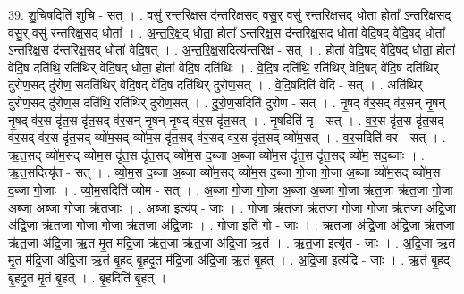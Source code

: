 \documentclass[17pt]{extarticle}
\begin{document}
39. शु॒चि॒षदिति॑ शुचि - सत् । . वसु॑ रन्तरिक्ष॒स द॑न्तरिक्ष॒सद् वसु॒र् वसु॑ रन्तरिक्ष॒सद् धोता॒ होता᳚ ऽन्तरिक्ष॒सद् वसु॒र् वसु॑ रन्तरिक्ष॒सद् धोता᳚ । . अ॒न्त॒रि॒क्ष॒द् धोता॒ होता᳚ ऽन्तरिक्ष॒स द॑न्तरिक्ष॒सद् धोता॑ वेदि॒षद् वे॑दि॒षद् धोता᳚ ऽन्तरिक्ष॒स द॑न्तरिक्ष॒सद् धोता॑ वेदि॒षत् । . अ॒न्त॒रि॒क्ष॒सदित्य॑न्तरिक्ष - सत् । . होता॑ वेदि॒षद् वे॑दि॒षद् धोता॒ होता॑ वेदि॒ष दति॑थि॒ रति॑थिर् वेदि॒षद् धोता॒ होता॑ वेदि॒ष दति॑थिः । . वे॒दि॒ष दति॑थि॒ रति॑थिर् वेदि॒षद् वे॑दि॒ष दति॑थिर् दुरोण॒सद् दु॑रोण॒ सदति॑थिर् वेदि॒षद् वे॑दि॒ष दति॑थिर् दुरोण॒सत् । . वे॒दि॒षदिति॑ वेदि - सत् । . अति॑थिर् दुरोण॒सद् दु॑रोण॒स दति॑थि॒ रति॑थिर् दुरोण॒सत् । . दु॒रो॒ण॒सदिति॑ दुरोण - सत् । . नृ॒षद् व॑र॒सद् व॑र॒सन् नृ॒षन् नृ॒षद् व॑र॒स दृ॑त॒स दृ॑त॒सद् व॑र॒सन् नृ॒षन् नृ॒षद् व॑र॒स दृ॑त॒सत् । . नृ॒षदिति॑ नृ - सत् । . व॒र॒स दृ॑त॒स दृ॑त॒सद् व॑र॒सद् व॑र॒स दृ॑त॒सद् व्यो॑म॒सद् व्यो॑म॒स दृ॑त॒सद् व॑र॒सद् व॑र॒स दृ॑त॒सद् व्यो॑म॒सत् । . व॒र॒सदिति॑ वर - सत् । . ऋ॒त॒सद् व्यो॑म॒सद् व्यो॑म॒स दृ॑त॒स दृ॑त॒सद् व्यो॑म॒स द॒ब्जा अ॒ब्जा व्यो॑म॒स दृ॑त॒स दृ॑त॒सद् व्यो॑म॒ सद॒ब्जाः । . ऋ॒त॒सदित्यृ॑त - सत् । . व्यो॒म॒स द॒ब्जा अ॒ब्जा व्यो॑म॒सद् व्यो॑म॒स द॒ब्जा गो॒जा गो॒जा अ॒ब्जा व्यो॑म॒सद् व्यो॑म॒स द॒ब्जा गो॒जाः । . व्यो॒म॒सदिति॑ व्योम - सत् । . अ॒ब्जा गो॒जा गो॒जा अ॒ब्जा अ॒ब्जा गो॒जा ऋ॑त॒जा ऋ॑त॒जा गो॒जा अ॒ब्जा अ॒ब्जा गो॒जा ऋ॑त॒जाः । . अ॒ब्जा इत्य॑प् - जाः । . गो॒जा ऋ॑त॒जा ऋ॑त॒जा गो॒जा गो॒जा ऋ॑त॒जा अ॑द्रि॒जा अ॑द्रि॒जा ऋ॑त॒जा गो॒जा गो॒जा ऋ॑त॒जा अ॑द्रि॒जाः । . गो॒जा इति॑ गो - जाः । . ऋ॒त॒जा अ॑द्रि॒जा अ॑द्रि॒जा ऋ॑त॒जा ऋ॑त॒जा अ॑द्रि॒जा ऋ॒त मृ॒त म॑द्रि॒जा ऋ॑त॒जा ऋ॑त॒जा अ॑द्रि॒जा ऋ॒तं । . ऋ॒त॒जा इत्यृ॑त - जाः । . अ॒द्रि॒जा ऋ॒त मृ॒त म॑द्रि॒जा अ॑द्रि॒जा ऋ॒तं बृ॒हद् बृ॒हदृ॒त म॑द्रि॒जा अ॑द्रि॒जा ऋ॒तं बृ॒हत् । . अ॒द्रि॒जा इत्य॑द्रि - जाः । . ऋ॒तं बृ॒हद् बृ॒हदृ॒त मृ॒तं बृ॒हत् । . बृ॒हदिति॑ बृ॒हत् । \newline
\pagebreak
{}
\end{document}
